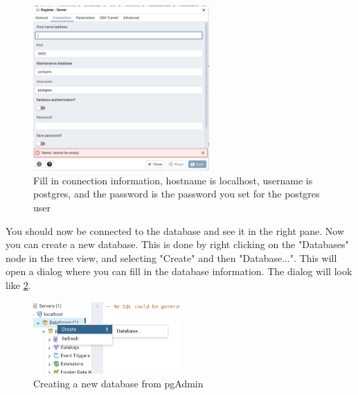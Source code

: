 \begin{figure}[H]
    \centering
    \includegraphics[width=0.6\textwidth]{content/1-relational-databases/figures/pgadmin/4.png}
    \caption{Fill in connection information, hostname is localhost, username is postgres, and the password is the password you set for the postgres user}
    \label{fig:1.pgadmin4}
\end{figure}


You should now be connected to the database and see it in the right pane.
Now you can create a new database. This is done by right clicking on the "Databases" node in the tree view, and selecting "Create" and then "Database...". This will open a dialog where you can fill in the database information. The dialog will look like \cref{fig:1.pgadmin6}.

\begin{figure}[H]
    \centering
    \includegraphics[width=0.5\textwidth]{content/1-relational-databases/figures/pgadmin/6.png}
    \caption{Creating a new database from pgAdmin}
    \label{fig:1.pgadmin6}
\end{figure}

